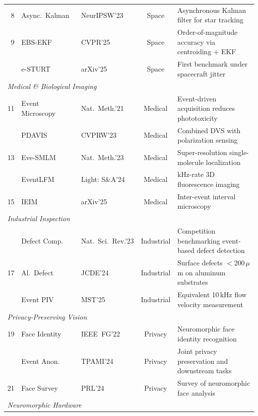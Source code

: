 \begin{table}[t]
{\begin{tabular}{rl l c l}
8 & Async.~Kalman~\cite{afshar2023asynckalman} & NeurIPSW'23 & Space & Asynchronous Kalman filter for star tracking \\
9 & EBS-EKF~\cite{liu2025ebsekf} & CVPR'25 & Space & Order-of-magnitude accuracy via centroiding + EKF \\
\rowalt
10 & e-STURT~\cite{chin2025esturt} & arXiv'25 & Space & First benchmark under spacecraft jitter \\
\midrule
\multicolumn{5}{l}{\textit{Medical \& Biological Imaging}} \\
\midrule
11 & Event Microscopy~\cite{wang2021microscopy} & Nat.~Meth.'21 & Medical & Event-driven acquisition reduces phototoxicity \\
\rowalt
12 & PDAVIS~\cite{gruev2023pdavis} & CVPRW'23 & Medical & Combined DVS with polarization sensing \\
13 & Eve-SMLM~\cite{bhatt2023evesmlm} & Nat.~Meth.'23 & Medical & Super-resolution single-molecule localization \\
\rowalt
14 & EventLFM~\cite{li2024eventlfm} & Light: S\&A'24 & Medical & kHz-rate 3D fluorescence imaging \\
15 & IEIM~\cite{wang2025ieim} & arXiv'25 & Medical & Inter-event interval microscopy \\
\midrule
\multicolumn{5}{l}{\textit{Industrial Inspection}} \\
\midrule
\rowalt
16 & Defect Comp.~\cite{wang2023surfacedefect} & Nat.~Sci.~Rev.'23 & Industrial & Competition benchmarking event-based defect detection \\
17 & Al.~Defect~\cite{li2024aluminumdefect} & JCDE'24 & Industrial & Surface defects $<$200\,$\mu$m on aluminum substrates \\
\rowalt
18 & Event PIV~\cite{guo2025eventpiv} & MST'25 & Industrial & Equivalent 10\,kHz flow velocity measurement \\
\midrule
\multicolumn{5}{l}{\textit{Privacy-Preserving Vision}} \\
\midrule
19 & Face Identity~\cite{barua2022faceidentity} & IEEE~FG'22 & Privacy & Neuromorphic face identity recognition \\
\rowalt
20 & Event Anon.~\cite{ahmad2024eventanontpami} & TPAMI'24 & Privacy & Joint privacy preservation and downstream tasks \\
21 & Face Survey~\cite{berlincioni2024facesurvey} & PRL'24 & Privacy & Survey of neuromorphic face analysis \\
\midrule
\multicolumn{5}{l}{\textit{Neuromorphic Hardware}} \\

\end{tabular}}
\end{table}
